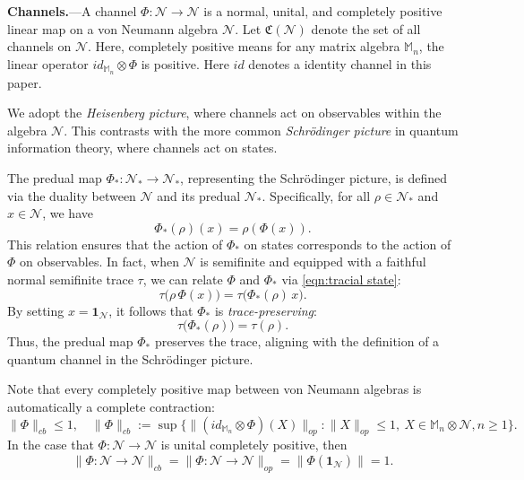 \documentclass[11pt,reqno]{amsart}
\numberwithin{equation}{section}
\newcommand{\mb}{\mathbb}
\newcommand{\mc}{\mathcal}
\begin{document}
\textbf{Channels.}---A channel \( \Phi: \mathcal{N} \to \mathcal{N} \) is a normal, unital, and completely positive linear map on a von Neumann algebra \( \mathcal{N} \). Let $\mathfrak{C}(\mathcal N)$ denote the set of all channels on $\mc N$. Here, completely positive means for any matrix algebra $\mb M_n$, the linear operator $id_{\mb M_n} \otimes \Phi$ is positive. Here $id$ denotes a identity channel in this paper.

We adopt the \textit{Heisenberg picture}, where channels act on observables within the algebra \( \mathcal{N} \). This contrasts with the more common \textit{Schr\"odinger picture} in quantum information theory, where channels act on states.

The predual map \( \Phi_*: \mathcal{N}_* \to \mathcal{N}_* \), representing the Schr\"odinger picture, is defined via the duality between \( \mathcal{N} \) and its predual \( \mathcal{N}_* \). Specifically, for all \( \rho \in \mathcal{N}_* \) and \( x \in \mathcal{N} \), we have
\begin{equation}
    \Phi_*(\rho)(x) = \rho(\Phi(x)).
\end{equation}
This relation ensures that the action of \( \Phi_* \) on states corresponds to the action of \( \Phi \) on observables. In fact, when \( \mathcal{N} \) is semifinite and equipped with a faithful normal semifinite trace \( \tau \), we can relate \( \Phi \) and \( \Phi_* \) via \eqref{eqn:tracial state}:
\begin{equation}
    \tau\big( \rho\, \Phi(x) \big) = \tau\big( \Phi_*(\rho)\, x \big).
\end{equation}
By setting \( x = \mathbf{1}_{\mathcal{N}} \), it follows that \( \Phi_* \) is \textit{trace-preserving}:
\begin{equation}
    \tau\big( \Phi_*(\rho) \big) = \tau(\rho).
\end{equation}
Thus, the predual map \( \Phi_* \) preserves the trace, aligning with the definition of a quantum channel in the Schr\"odinger picture. 

Note that every completely positive map between von Neumann algebras is automatically a complete contraction:
\begin{equation}\label{ineqn:contractive}
    \|\Phi\|_{cb} \le 1,\quad \|\Phi\|_{cb}:= \sup\{ \|(id_{\mb M_n} \otimes \Phi)(X)\|_{op}: \|X\|_{op} \le 1,\ X \in \mb M_n\otimes \mc N, n\ge 1\}.
\end{equation} In the case that $\Phi: \mc N \to \mc N$ is unital completely positive, then \[\|\Phi: \mc N \to \mc N\|_{cb} = \|\Phi: \mc N \to \mc N\|_{op} = \|\Phi(\textbf{1}_{\mc N})\| = 1.\]
\end{document}
